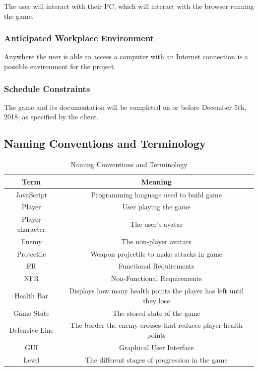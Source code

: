 \documentclass[12pt, titlepage]{article}
\begin{document}
The user will interact with their PC, which will interact with the browser running the game. 
\subsubsection{Anticipated Workplace Environment}

Anywhere the user is able to access a computer with an Internet connection is a possible environment for the project. 

\subsubsection{Schedule Constraints}

The game and its documentation will be completed on or before December 5th, 2018, as specified by the client. 

\subsection{Naming Conventions and Terminology}

\begin{table}[H]
    \caption{Naming Conventions and Terminology}
    \centering
    \begin{tabular}{c|c}
         \bf Term & \bf Meaning \\
         \hline 
         JavaScript & Programming language used to build game \\
         Player & User playing the game \\
         Player character & The user's avatar \\
         Enemy & The non-player avatars \\
         Projectile & Weapon projectile to make attacks in game \\
         FR & Functional Requirements \\
         NFR & Non-Functional Requirements \\ 
         Health Bar & Displays how many health points the player has left until they lose \\
         Game State & The stored state of the game \\
         Defensive Line & The border the enemy crosses that reduces player health points \\
         GUI & Graphical User Interface \\
         Level & The different stages of progression in the game \\
    \end{tabular}

    \label{tab:my_label}
\end{table}
\end{document}
